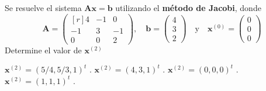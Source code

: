 \begin{pregunta}
\begin{cuerpo}
Se resuelve el sistema $\boldsymbol{A} \boldsymbol{x} = \boldsymbol{b}$ utilizando el \textbf{m\'etodo de Jacobi},  donde
\begin{equation*}
\boldsymbol{A} = \begin{pmatrix*}[r]
  4  & -1 & 0 \\
 -1  &3  &-1\\
  0	 &0  &2
\end{pmatrix*}, \quad
\boldsymbol{b} = \begin{pmatrix}
 4   \\
 3  \\
  2		
\end{pmatrix} \quad \textrm{y} \quad
\boldsymbol{x}^{(0)} = \begin{pmatrix}
 0   \\
 0  \\
  0		
\end{pmatrix}
\end{equation*}
Determine el valor de $\boldsymbol{x}^{(2)}$ 
\end{cuerpo}
\begin{multicols}{2}
\begin{alternativas}
{$\boldsymbol{x}^{(2)} = (5/4,5/3,1)^t$ .} %
{$\boldsymbol{x}^{(2)} = (4,3,1)^t$ .}
{$\boldsymbol{x}^{(2)} = (0,0,0)^t$ .}
{$\boldsymbol{x}^{(2)} = (1,1,1)^t$ .}
\end{alternativas}
\end{multicols}
\justificacion{10cm}
\end{pregunta}
